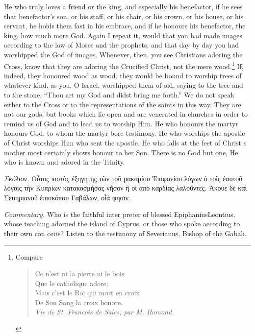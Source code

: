 \documentclass[10pt]{book}
\newcommand{\switchgreek}[1][]{\selectlanguage{polutonikogreek} \switchcolumn*[#1]}
\newcommand{\switchenglish}{\selectlanguage{english} \switchcolumn}
\begin{document}
\begin{paracol}{2}
He who truly loves a friend or the king, 
and especially his benefactor, if he sees that 
benefactor's son, or his staff, or his chair, or 
his crown, or his house, or his servant, he 
holds them fast in his embrace, and if he 
honours his benefactor, the king, how much 
more God. Again I repeat it, would that 
you had made images according to the law 
of Moses and the prophets, and that day by 
day you had worshipped the God of images. 
Whenever, then, you see Christians adoring 
the Cross, know that they are adoring the 
Crucified Christ, not the mere wood.\footnote{Compare\textemdash
\begin{verse}
Ce n'est ni la pierre ni le bois \\
\hspace{2em} Que le catholique adore; \\
Mais c'est le Roi qui mort en croix \\
\hspace{2em} De Son Sang la croix honore. \\
\textemdash\emph{Vie de St. Francois de Sales, par M. Hamond.} 
\end{verse}
}
If, indeed, they honoured wood as wood, they 
would be bound to worship trees of whatever 
kind, as you, O Israel, worshipped them of 
old, saying to the tree and to the stone, 
``Thou art my God and didst bring me forth.''
We do not speak either to the Cross or to 
the representations of the saints in this way. 
They are not our gods, but books which lie 
open and are venerated in churches in order 
to remind us of God and to lead us to 
worship Him. He who honours the martyr 
honours God, to whom the martyr bore 
testimony. He who worships the apostle 
of Christ worships Him who sent the apostle. 
He who falls at the feet of Christ s mother 
most certainly shows honour to her Son. 
There is no God but one, He who is known 
and adored in the Trinity. 

\switchgreek

\emph{Σκόλιον.} Οὗτος πιστὸς ἐξηγητὴς τῶν τοῦ μακαρίου Ἐπιφανίου λόγων ὁ τοῖς
ἑαυτοῦ λόγοις τὴν Κυπρίων κατακοσμήσας νῆσον ἢ οἱ ἀπὸ καρδίας λαλοῦντες.
Ἄκουε δὲ καὶ Σευηριανοῦ ἐπισκόπου Γαβάλων, οἷά φησιν.

\switchenglish

\emph{Commentary.} Who is the faithful inter 
preter of blessed Epiphanius\textemdash Leontius, whose 
teaching adorned the island of Cyprus, or 
those who spoke according to their own con 
ceits? Listen to the testimony of Severianus, 
Bishop of the Gabali. 


\end{paracol}
\end{document}
